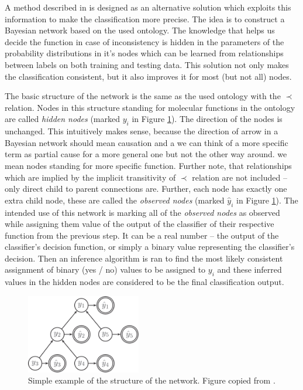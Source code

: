 \documentclass[11pt,twoside,a4paper]{book}
\begin{document}
A method described in \cite{bnet} is designed
as an alternative solution which exploits this
information to make the classification more precise.
The idea is to construct a Bayesian network based on
the used ontology.
The knowledge that helps us decide the function
in case of inconsistency
is hidden in the parameters of the probability 
distributions in it's nodes 
which can be learned from relationships between
labels on both training and testing data.
This solution not only makes the classification 
consistent,
but it also improves it for most (but not all) nodes.

The basic structure of the network is the same as the used ontology 
with the $\prec$ relation. 
Nodes in this structure standing for molecular functions
in the ontology are called \emph{hidden nodes} (marked $y_i$ in Figure \ref{fig:net}). 
The direction of the nodes is unchanged.
This intuitively makes sense,
because the direction of arrow in a Bayesian 
network should mean causation
and a we can think of a more specific term as partial cause
for a more general one but not the other way around.
we mean nodes standing for more specific function.
Further note, that relationships which are implied by the implicit transitivity
of $\prec$ relation are not included -- only direct child to parent connections are.
Further, each node has exactly one extra child node, these
are called the \emph{observed nodes} (marked $\hat{y}_i$ in Figure \ref{fig:net}).
The intended use of this network
is marking all of the \emph{observed nodes} as observed
while assigning them value of the output 
of the classifier of their respective function from the previous step.
It can be a real number -- the output of the classifier's decision function,
or simply a binary value representing the classifier's decision.
Then an inference algorithm is ran
to find the most likely consistent assignment of binary (yes / no) values to be assigned to $y_i$
and these inferred values in the hidden nodes 
are considered to be the final classification output.

\begin{figure}[h]
\begin{center}
\includegraphics[width=5cm]{figures/net}
\caption{Simple example of the structure of the network.
Figure copied from \cite{bnet}.}
\label{fig:net}
\end{center}
\end{figure}
\end{document}
